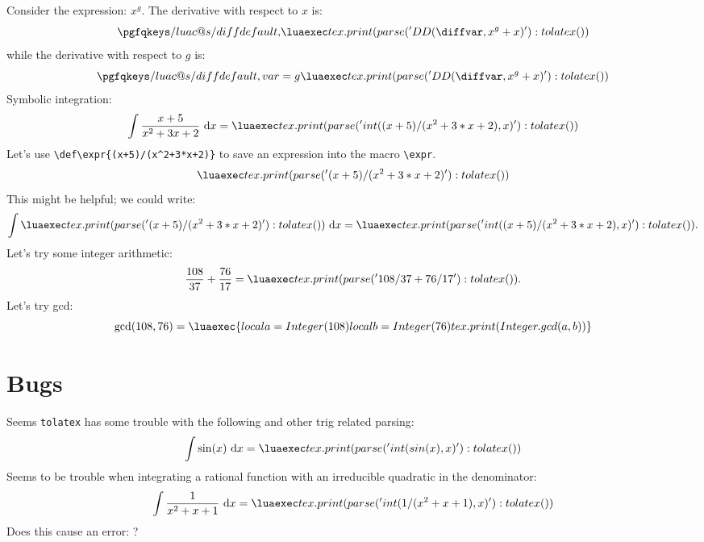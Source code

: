 \documentclass{article}
\begin{document}
Consider the expression: $x^g$. The derivative with respect to $x$ is:
\[ \diff{x^g+x} \] %
while the derivative with respect to $g$ is:
\[ \diff[var=g]{x^g+x} \] 
Symbolic integration:
\[ \int \frac{x+5}{x^2+3x+2}\ \mathrm{d}x = \eval{int((x+5)/(x^2+3*x+2),x)} \]
Let's use \verb|\def\expr{(x+5)/(x^2+3*x+2)}| to save an expression into the macro \verb|\expr|. 
\def\expr{(x+5)/(x^2+3*x+2)}
\[ \eval{\expr} \] 
This might be helpful; we could write:
\[ \int \eval{\expr}\ \mathrm{d}x = \eval{int(\expr,x)}.\] 
Let's try some integer arithmetic:
\[ \frac{108}{37} + \frac{76}{17} = \eval{108/37+76/17}.\]
Let's try gcd:
\[ \gcd(108,76) = \luaexec{
local a = Integer(108)
local b = Integer(76)
tex.print(Integer.gcd(a,b))
} \] 


\section{Bugs}
{\color{gray} 
Seems \verb|tolatex| has some trouble with the following and other trig related parsing:
\[ \int \sin(x)\ \mathrm{d}x = \eval{int(sin(x),x)}\] 
Seems to be trouble when integrating a rational function with an irreducible quadratic in the denominator:
\[ \int \frac{1}{x^2+x+1}\ \mathrm{d}x = \eval{int(1/(x^2+x+1),x)}\]
}
Does this cause an error:  ?
\end{document}
